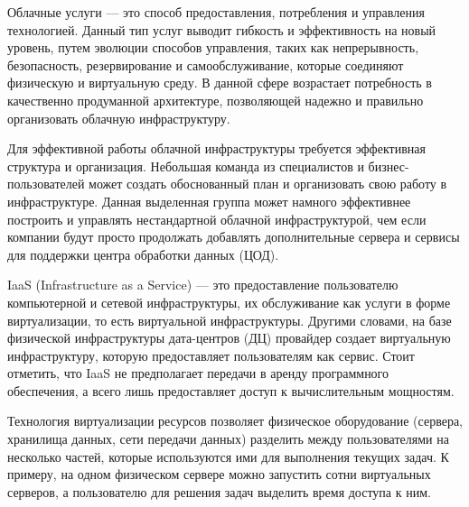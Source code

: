 
Облачные услуги --- это способ предоставления, потребления и управления технологией.
Данный тип услуг выводит гибкость и эффективность на новый уровень, путем эволюции способов управления, таких как непрерывность, безопасность, резервирование и самообслуживание, которые соединяют физическую и виртуальную среду.
В данной сфере возрастает потребность в качественно продуманной архитектуре, позволяющей надежно и правильно организовать облачную инфраструктуру.

Для эффективной работы облачной инфраструктуры требуется эффективная структура и организация.
Небольшая команда из специалистов и бизнес-пользователей может создать обоснованный план и организовать свою работу в инфраструктуре.
Данная выделенная группа может намного эффективнее построить и управлять нестандартной облачной инфраструктурой, чем если компании будут просто продолжать добавлять дополнительные сервера и сервисы для поддержки центра обработки данных (ЦОД).

IaaS (Infrastructure as a Service) --- это предоставление пользователю компьютерной и сетевой инфраструктуры, их обслуживание как услуги в форме виртуализации, то есть виртуальной инфраструктуры.
Другими словами, на базе физической инфраструктуры дата-центров (ДЦ) провайдер создает виртуальную инфраструктуру, которую предоставляет пользователям как сервис.
Стоит отметить, что IaaS не предполагает передачи в аренду программного обеспечения, а всего лишь предоставляет доступ к вычислительным мощностям.

Технология виртуализации ресурсов позволяет физическое оборудование (сервера, хранилища данных, сети передачи данных) разделить между пользователями на несколько частей, которые используются ими для выполнения текущих задач.
К примеру, на одном физическом сервере можно запустить сотни виртуальных серверов, а пользователю для решения задач выделить время доступа к ним.

\clearpage
